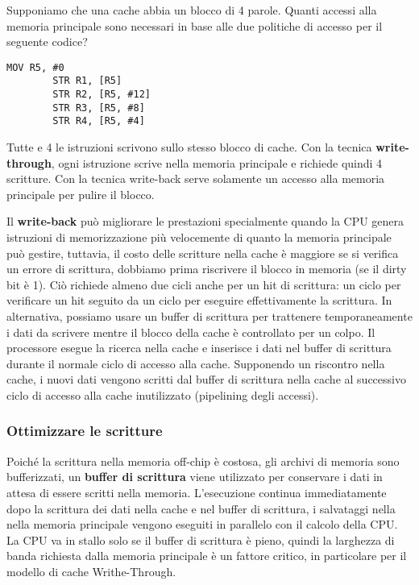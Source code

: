 \begin{example}
	Supponiamo che una cache abbia un blocco di 4 parole. Quanti accessi alla memoria principale sono necessari in base alle due politiche di accesso per il seguente codice?
	\begin{lstlisting}[language={[x86masm]Assembler}]
		MOV R5, #0
		STR R1, [R5]
		STR R2, [R5, #12]
		STR R3, [R5, #8]
		STR R4, [R5, #4]
	\end{lstlisting}
	Tutte e 4 le istruzioni scrivono sullo stesso blocco di cache. Con la tecnica \textbf{write-through}, ogni istruzione scrive nella memoria principale e richiede quindi 4 scritture. Con la tecnica write-back serve solamente un accesso alla memoria principale per pulire il blocco.
\end{example}

Il \textbf{write-back} può migliorare le prestazioni specialmente quando la CPU genera istruzioni di memorizzazione più velocemente di quanto la memoria principale può gestire, tuttavia, il costo delle scritture nella cache è maggiore se si verifica un errore di scrittura, dobbiamo prima riscrivere il blocco in memoria (se il dirty bit è 1). 
Ciò richiede almeno due cicli anche per un hit di scrittura: un ciclo per verificare un hit seguito da un ciclo per eseguire effettivamente la scrittura. In alternativa, possiamo usare un buffer di scrittura per trattenere temporaneamente i dati da scrivere mentre il blocco della cache è controllato per un colpo. 
Il processore esegue la ricerca nella cache e inserisce i dati nel buffer di scrittura durante il normale ciclo di accesso alla cache. Supponendo un riscontro nella cache, i nuovi dati vengono scritti dal buffer di scrittura nella cache al successivo ciclo di accesso alla cache inutilizzato (pipelining degli accessi).

\subsubsection{Ottimizzare le scritture}
Poiché la scrittura nella memoria off-chip è costosa, gli archivi di memoria sono bufferizzati, un \textbf{buffer di scrittura} viene utilizzato per conservare i dati in attesa di essere scritti nella memoria.
L'esecuzione continua immediatamente dopo la scrittura dei dati nella cache e nel buffer di scrittura, i salvataggi nella nella memoria principale vengono eseguiti in parallelo con il calcolo della CPU. 
La CPU va in stallo solo se il buffer di scrittura è pieno, quindi la larghezza di banda richiesta dalla memoria principale è un fattore critico, in particolare per il modello di cache Writhe-Through.

